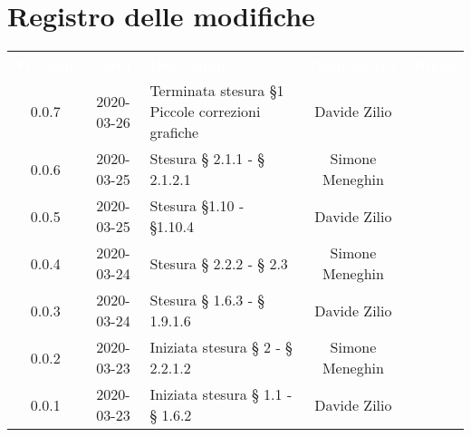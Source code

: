 
\section*{Registro delle modifiche}
{
	\centering
	\begin{longtable}{ c c  C{4cm}  c  c }
		\textcolor{white}{\textbf{Versione}} & \textcolor{white}{\textbf{Data}} & \textcolor{white}{\textbf{Descrizione}} & \textcolor{white}{\textbf{Nominativo}} & \textcolor{white}{\textbf{Ruolo}}\\
		0.0.7 & 2020-03-26 & Terminata stesura \S 1 \newline Piccole correzioni grafiche & Davide Zilio &\ana{}\\
		0.0.6 & 2020-03-25 & Stesura § 2.1.1 - § 2.1.2.1 & Simone Meneghin &\ana{}\\	
		0.0.5 & 2020-03-25 & Stesura \S 1.10 - \S 1.10.4 & Davide Zilio & \ana{}\\

		0.0.4 & 2020-03-24 & Stesura § 2.2.2 - § 2.3 & Simone Meneghin &\ana{}\\		
		
		0.0.3 & 2020-03-24 & Stesura § 1.6.3 - § 1.9.1.6 & Davide Zilio &\ana{}\\
		
		0.0.2 & 2020-03-23 & Iniziata stesura § 2 - § 2.2.1.2 & Simone Meneghin &\ana{}\\
		
		0.0.1 & 2020-03-23 & Iniziata stesura § 1.1 - § 1.6.2 & Davide Zilio &\ana{}\\		
		
	\end{longtable}

}